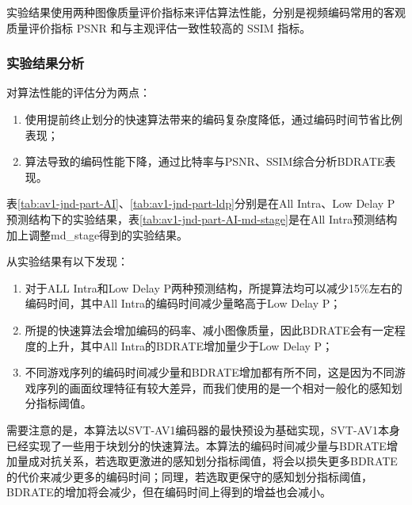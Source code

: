   实验结果使用两种图像质量评价指标来评估算法性能，分别是视频编码常用的客观质量评价指标 PSNR 和与主观评估一致性较高的 SSIM 指标。

  \subsubsection{实验结果分析}

  对算法性能的评估分为两点：

  \begin{enumerate}[label=\arabic*)]
    \item 使用提前终止划分的快速算法带来的编码复杂度降低，通过编码时间节省比例表现；
    \item 算法导致的编码性能下降，通过比特率与PSNR、SSIM综合分析BDRATE表现。
  \end{enumerate}

  表\ref{tab:av1-jnd-part-AI}、\ref{tab:av1-jnd-part-ldp}分别是在All Intra、Low Delay P预测结构下的实验结果，表\ref{tab:av1-jnd-part-AI-md-stage}是在All Intra预测结构加上调整md\_stage得到的实验结果。

  从实验结果有以下发现：

  \begin{enumerate}[label=\arabic*)]
    \item 对于ALL Intra和Low Delay P两种预测结构，所提算法均可以减少15\%左右的编码时间，其中All Intra的编码时间减少量略高于Low Delay P；
    \item 所提的快速算法会增加编码的码率、减小图像质量，因此BDRATE会有一定程度的上升，其中All Intra的BDRATE增加量少于Low Delay P；
    \item 不同游戏序列的编码时间减少量和BDRATE增加都有所不同，这是因为不同游戏序列的画面纹理特征有较大差异，而我们使用的是一个相对一般化的感知划分指标阈值。
  \end{enumerate}

  需要注意的是，本算法以SVT-AV1编码器的最快预设为基础实现，SVT-AV1本身已经实现了一些用于块划分的快速算法。本算法的编码时间减少量与BDRATE增加量成对抗关系，若选取更激进的感知划分指标阈值，将会以损失更多BDRATE的代价来减少更多的编码时间；同理，若选取更保守的感知划分指标阈值，BDRATE的增加将会减少，但在编码时间上得到的增益也会减小。


